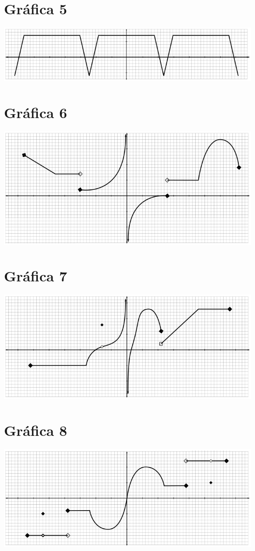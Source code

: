 \section{Gráfica 5}
\includegraphics{../img/graficas-funciones-5.png}

\section{Gráfica 6}
\includegraphics{../img/graficas-funciones-6.png}

\section{Gráfica 7}
\includegraphics{../img/graficas-funciones-7.png}

\section{Gráfica 8}
\includegraphics{../img/graficas-funciones-8.png}

